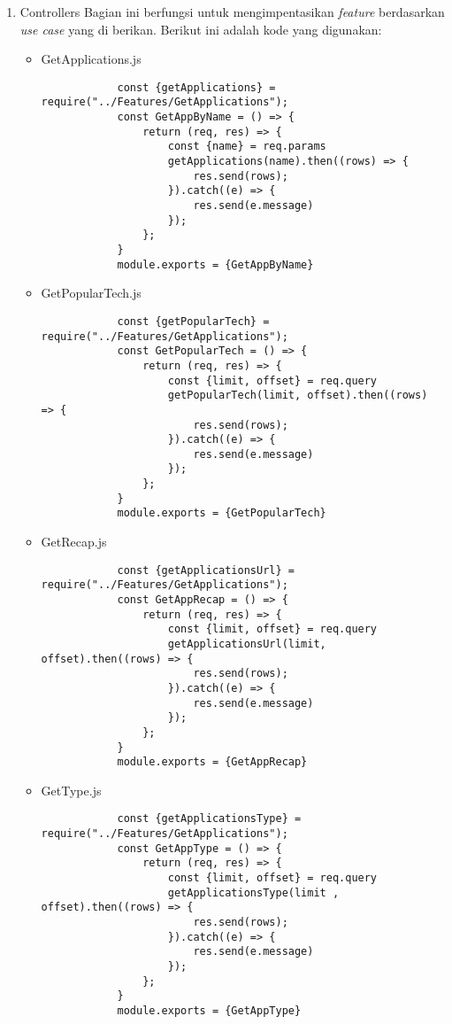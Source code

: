 \begin{enumerate}
	
	\item Controllers
	Bagian ini berfungsi untuk mengimpentasikan \textit{feature} berdasarkan \textit{use case} yang di berikan.
	Berikut ini adalah kode yang digunakan:
	\begin{itemize}
		\item GetApplications.js
		\begin{lstlisting}
			const {getApplications} = require("../Features/GetApplications");
			const GetAppByName = () => {
				return (req, res) => {
					const {name} = req.params
					getApplications(name).then((rows) => {
						res.send(rows);
					}).catch((e) => {
						res.send(e.message)
					});
				};
			}
			module.exports = {GetAppByName}
		\end{lstlisting}
	
		\item GetPopularTech.js
		\begin{lstlisting}
			const {getPopularTech} = require("../Features/GetApplications");
			const GetPopularTech = () => {
				return (req, res) => {
					const {limit, offset} = req.query
					getPopularTech(limit, offset).then((rows) => {
						res.send(rows);
					}).catch((e) => {
						res.send(e.message)
					});
				};
			}
			module.exports = {GetPopularTech}
		\end{lstlisting}
	
		\item GetRecap.js
		\begin{lstlisting}
			const {getApplicationsUrl} = require("../Features/GetApplications");
			const GetAppRecap = () => {
				return (req, res) => {
					const {limit, offset} = req.query
					getApplicationsUrl(limit, offset).then((rows) => {
						res.send(rows);
					}).catch((e) => {
						res.send(e.message)
					});
				};
			}
			module.exports = {GetAppRecap}
		\end{lstlisting}
		
		\item GetType.js
		\begin{lstlisting}
			const {getApplicationsType} = require("../Features/GetApplications");
			const GetAppType = () => {
				return (req, res) => {
					const {limit, offset} = req.query
					getApplicationsType(limit , offset).then((rows) => {
						res.send(rows);
					}).catch((e) => {
						res.send(e.message)
					});
				};
			}
			module.exports = {GetAppType}
		\end{lstlisting}
	
	\end{itemize}
\end{enumerate}




